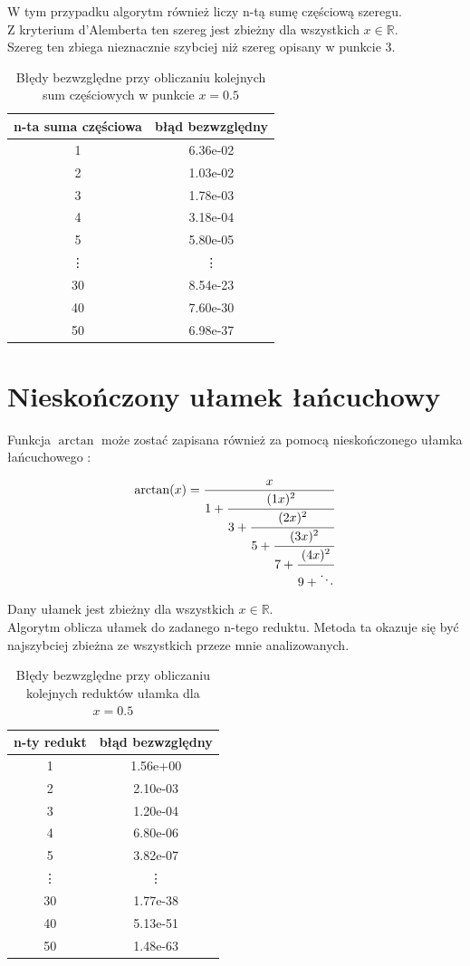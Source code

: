 \documentclass{article}
\begin{document}
W tym przypadku algorytm również liczy n-tą sumę częściową szeregu.\\
Z kryterium d'Alemberta ten szereg jest zbieżny dla wszystkich $x \in \mathbb{R} $.\\
Szereg ten zbiega nieznacznie szybciej niż szereg opisany w punkcie 3.

\begin{table}[h]
	\centering
	\begin{tabular}{|c|c|} \hline
		n-ta suma częściowa & błąd bezwzględny \\ \hline
		1 &  6.36e-02\\
		2 &  1.03e-02\\
		3 &  1.78e-03\\
		4 &  3.18e-04\\
		5 &  5.80e-05\\
		\vdots & \vdots \\
		30  &  8.54e-23 \\
		40 &  7.60e-30 \\
		50 &  6.98e-37\\
		\hline
	\end{tabular}
	\caption{Błędy bezwzględne przy obliczaniu kolejnych sum częściowych w punkcie $x = 0.5$}
\end{table}

\section{Nieskończony ułamek łańcuchowy}
Funkcja $\arctan$ może zostać zapisana również za pomocą nieskończonego ułamka łańcuchowego \cite{wolfram}\cite{deutsch}:

\begin{equation}
\arctan(x)={\frac {x}{1+{\cfrac {(1x)^{2}}{3+{\cfrac {(2x)^{2}}{5+{\cfrac {(3x)^{2}}{7+{\cfrac {(4x)^{2}}{9+\ddots }}}}}}}}}}
\end{equation}

Dany ułamek jest zbieżny dla wszystkich $x \in \mathbb{R} $.\\
Algorytm oblicza ułamek do zadanego n-tego reduktu. 
Metoda ta okazuje się być najszybciej zbieżna ze wszystkich przeze mnie analizowanych.

\begin{table}[h]
	\centering
	\begin{tabular}{|c|c|} \hline
		n-ty redukt & błąd bezwzględny \\ \hline
		1 &  1.56e+00\\
		2 &  2.10e-03\\
		3 &  1.20e-04\\
		4 &  6.80e-06\\
		5 &  3.82e-07\\
		\vdots & \vdots \\
		30  &  1.77e-38 \\
		40 &  5.13e-51 \\
		50 &  1.48e-63\\
		\hline
	\end{tabular}
	\caption{Błędy bezwzględne przy obliczaniu kolejnych reduktów ułamka dla $x = 0.5$}
\end{table}
\end{document}
